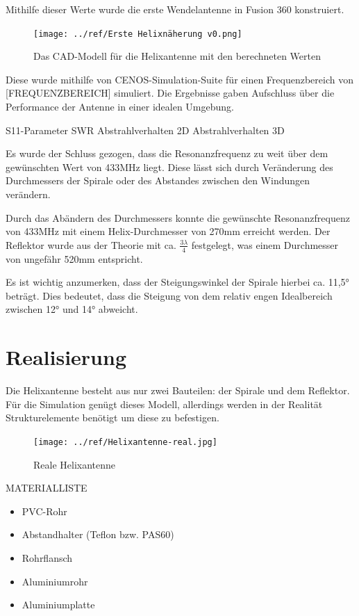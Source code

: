 Mithilfe dieser Werte wurde die erste Wendelantenne in Fusion 360 konstruiert. 

\begin{figure}[h!]
	\centering
	\texttt{[image: ../ref/Erste Helixnäherung v0.png]}
	\label{fig:ersteHelixnäherung}
	\caption{Das CAD-Modell für die Helixantenne mit den berechneten Werten}
\end{figure}

Diese wurde mithilfe von CENOS-Simulation-Suite für einen Frequenzbereich von [FREQUENZBEREICH] simuliert. Die Ergebnisse gaben Aufschluss über die Performance der Antenne in einer idealen Umgebung.

S11-Parameter
SWR
Abstrahlverhalten 2D
Abstrahlverhalten 3D

Es wurde der Schluss gezogen, dass die Resonanzfrequenz zu weit über dem gewünschten Wert von 433MHz liegt. Diese lässt sich durch Veränderung des Durchmessers der Spirale oder des Abstandes zwischen den Windungen verändern.

Durch das Abändern des Durchmessers konnte die gewünschte Resonanzfrequenz von 433MHz mit einem Helix-Durchmesser von 270mm erreicht werden. Der Reflektor wurde aus der Theorie mit ca. $\frac{3\lambda}{4}$ festgelegt, was einem Durchmesser von ungefähr 520mm entspricht.

Es ist wichtig anzumerken, dass der Steigungswinkel der Spirale hierbei ca. 11,5° beträgt. Dies bedeutet, dass die Steigung von dem relativ engen Idealbereich zwischen 12° und 14° abweicht.

\section{Realisierung}
Die Helixantenne besteht aus nur zwei Bauteilen: der Spirale und dem Reflektor. Für die Simulation genügt dieses Modell, allerdings werden in der Realität Strukturelemente benötigt um diese zu befestigen.

\begin{figure}[H]
	\centering
	\texttt{[image: ../ref/Helixantenne-real.jpg]}
	\caption{Reale Helixantenne}
	\label{fig:helix-real}
\end{figure}

MATERIALLISTE



\begin{itemize}
	\item PVC-Rohr
	\item Abstandhalter (Teflon bzw. PAS60)
	\item Rohrflansch
	\item Aluminiumrohr
	\item Aluminiumplatte
\end{itemize}

